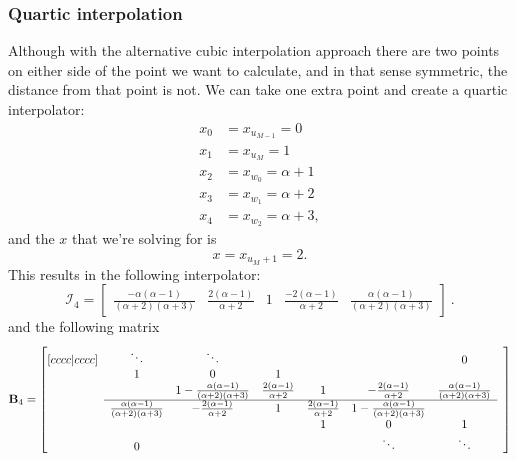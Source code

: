 \documentclass[dvipsnames]{article}
\begin{document}
\subsubsection{Quartic interpolation}
Although with the alternative cubic interpolation approach there are two points on either side of the point we want to calculate, and in that sense symmetric, the distance from that point is not. We can take one extra point and create a quartic interpolator:
\begin{equation}
    \begin{aligned}
     x_0 &= x_{u_{M-1}} = 0 \\     
     x_1 &= x_{u_{M}} = 1 \\
     x_2 &= x_{w_0} = \alpha + 1 \\
     x_3& = x_{w_1} = \alpha + 2 \\
     x_4 &= x_{w_2} = \alpha + 3,
    \end{aligned}
\end{equation}
and the $x$ that we're solving for is 
\begin{equation}
    x = x_{u_M+1} = 2.
\end{equation}
This results in the following interpolator:
\begin{equation}
    \mathcal{I}_4 = 
    \begin{bmatrix}
        \frac{-\alpha(\alpha - 1)}{(\alpha + 2)(\alpha + 3)}
        &
        \frac{2(\alpha - 1)}{\alpha + 2}&
        1&
        \frac{-2(\alpha - 1)}{\alpha + 2}&
        \frac{\alpha(\alpha - 1)}{(\alpha + 2)(\alpha + 3)}
    \end{bmatrix}\ .
\end{equation}
and the following matrix
\begin{equation}
    \mathbf{B}_4 = \begin{bmatrix}[cccc|cccc]
     & \ddots  &\ddots & & & & 0 & \\
       & 1 & 0 & 1 & & & & \\
      & & 1 - \frac{\alpha(\alpha - 1)}{(\alpha + 2)(\alpha + 3)}& \frac{2(\alpha - 1)}{\alpha + 2} & 1 & -\frac{2(\alpha - 1)}{\alpha + 2} &\frac{\alpha(\alpha - 1)}{(\alpha + 2)(\alpha + 3)}\\ \cline{2-7}
      & \frac{\alpha(\alpha - 1)}{(\alpha + 2)(\alpha + 3)} & -\frac{2(\alpha - 1)}{\alpha + 2}  & 1 & \frac{2(\alpha - 1)}{\alpha + 2}  & 1 - \frac{\alpha(\alpha - 1)}{(\alpha + 2)(\alpha + 3)} & & \\
         & & & &1 & 0 & 1  \\
         & 0 & &  &  &\ddots & \ddots &
    \end{bmatrix}
\end{equation}
\end{document}

